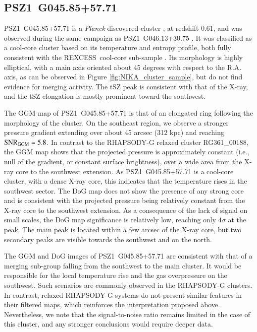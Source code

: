\documentclass[twocolumn,traditabstract]{aa}
\newcommand{\rexcess}{{\gwpfont REXCESS}}
\begin{document}
\subsection{PSZ1~G045.85+57.71}
\mbox{PSZ1~G045.85+57.71} is a \textit{Planck} discovered cluster \citep{PlanckXXIX2014}, at redshift 0.61, and was observed during the same campaign as \mbox{PSZ1~G046.13+30.75} \citep[see][for more details]{Ruppin2016}. It was classified as a cool-core cluster based on its temperature and entropy profile, both fully consistent with the \rexcess\ cool-core sub-sample \citep{Bohringer2007,Arnaud2010,Pratt2010}. Its morphology is highly elliptical, with a main axis oriented about 45 degrees with respect to the R.A. axis, as can be observed in Figure \ref{fig:NIKA_cluster_sample}, but \cite{Ruppin2016} do not find evidence for merging activity. The tSZ peak is consistent with that of the X-ray, and the tSZ elongation is mostly prominent toward the southwest.

The GGM map of \mbox{PSZ1~G045.85+57.71} is that of an elongated ring following the morphology of the cluster. On the southeast region, we observe a stronger pressure gradient extending over about 45 arcsec (312 kpc) and reaching ${\rm SNR}_{\rm GGM} = 5.8$. In contrast to the RHAPSODY-G relaxed cluster RG361\_00188, the GGM map shows that the projected pressure is approximately constant (i.e., null of the gradient, or constant surface brightness), over a wide area from the X-ray core to the southwest extension. As \mbox{PSZ1~G045.85+57.71} is a cool-core cluster, with a dense X-ray core, this indicates that the temperature rises in the southwest sector. The DoG map does not show the presence of any strong core and is consistent with the projected pressure being relatively constant from the X-ray core to the southwest extension. As a consequence of the lack of signal on small scales, the DoG map significance is relatively low, reaching only $4 \sigma$ at the peak. The main peak is located within a few arcsec of the X-ray core, but two secondary peaks are visible towards the southwest and on the north.

The GGM and DoG images of \mbox{PSZ1~G045.85+57.71} are consistent with that of a merging sub-group falling from the southwest to the main cluster. It would be responsible for the local temperature rise and the gas overpressure on the southwest. Such scenarios are commonly observed in the RHAPSODY-G clusters. In contrast, relaxed RHAPSODY-G systems do not present similar features in their filtered maps, which reinforces the interpretation proposed above. Nevertheless, we note that the signal-to-noise ratio remains limited in the case of this cluster, and any stronger conclusions would require deeper data.
\end{document}
